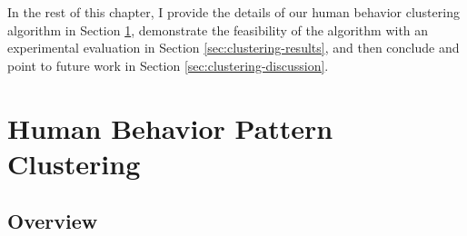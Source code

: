 In the rest of this chapter, I provide the details of our human
behavior clustering algorithm in
Section \ref{sec:clustering-algorithm}, demonstrate the feasibility of
the algorithm with an experimental evaluation in
Section \ref{sec:clustering-results}, and then conclude and point to
future work in Section \ref{sec:clustering-discussion}.

\section{Human Behavior Pattern Clustering}
\label{sec:clustering-algorithm}

\subsection{Overview}

